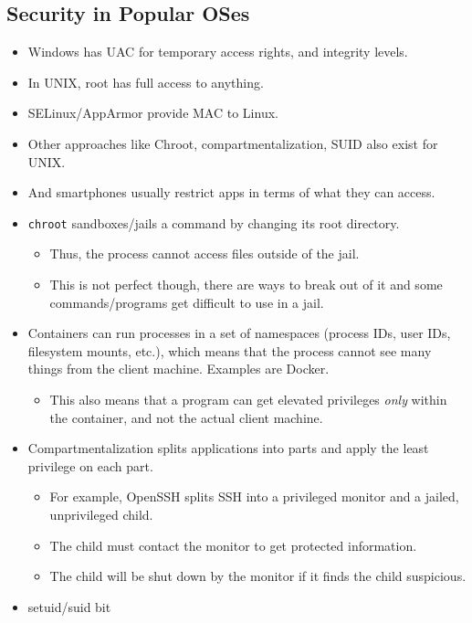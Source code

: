 \documentclass{article}
\begin{document}
\subsection{Security in Popular OSes}
\begin{itemize}
    \item Windows has UAC for temporary access rights, and integrity levels.
    \item In UNIX, root has full access to anything.
    \item SELinux/AppArmor provide MAC to Linux.
    \item Other approaches like Chroot, compartmentalization, SUID also exist for UNIX.
    \item And smartphones usually restrict apps in terms of what they can access.
    \item \lstinline{chroot} sandboxes/jails a command by changing its root directory.
        \begin{itemize}
            \item Thus, the process cannot access files outside of the jail.
            \item This is not perfect though, there are ways to break out of it and some commands/programs get difficult to use in a jail.
        \end{itemize}
    \item Containers can run processes in a set of namespaces (process IDs, user IDs, filesystem mounts, etc.), which means that the process cannot see many things from the client machine.  Examples are Docker.
        \begin{itemize}
            \item This also means that a program can get elevated privileges \emph{only} within the container, and not the actual client machine.
        \end{itemize}
    \item Compartmentalization splits applications into parts and apply the least privilege on each part.
        \begin{itemize}
            \item For example, OpenSSH splits SSH into a privileged monitor and a jailed, unprivileged child.
            \item The child must contact the monitor to get protected information.
            \item The child will be shut down by the monitor if it finds the child suspicious.
        \end{itemize}
    \item setuid/suid bit

\end{itemize}
\end{document}
